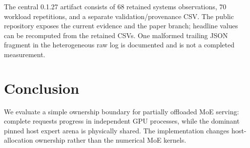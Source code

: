 The central 0.1.27 artifact consists of 68 retained systems observations, 70 workload repetitions, and a separate validation/provenance CSV. The public repository exposes the current evidence and the paper branch; headline values can be recomputed from the retained CSVs. One malformed trailing JSON fragment in the heterogeneous raw log is documented and is not a completed measurement.

\section{Conclusion}
We evaluate a simple ownership boundary for partially offloaded MoE serving: complete requests progress in independent GPU processes, while the dominant pinned host expert arena is physically shared. The implementation changes host-allocation ownership rather than the numerical MoE kernels.


